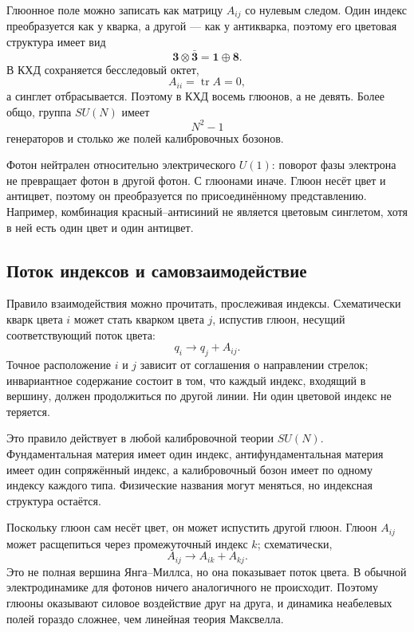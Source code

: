 Глюонное поле можно записать как матрицу \(A_{ij}\) со нулевым следом. Один индекс преобразуется как у кварка, а другой — как у антикварка, поэтому его цветовая структура имеет вид
\begin{equation}
\boldsymbol 3\otimes\bar{\boldsymbol 3}
=\boldsymbol 1\oplus\boldsymbol 8.
\end{equation}
В КХД сохраняется бесследовый октет,
\begin{equation}
A_{ii}=\operatorname{tr}A=0,
\end{equation}
а синглет отбрасывается. Поэтому в КХД восемь глюонов, а не девять. Более общо, группа \(SU(N)\) имеет
\begin{equation}
N^2-1
\end{equation}
генераторов и столько же полей калибровочных бозонов.

Фотон нейтрален относительно электрического \(U(1)\): поворот фазы электрона не превращает фотон в другой фотон. С глюонами иначе. Глюон несёт цвет и антицвет, поэтому он преобразуется по присоединённому представлению. Например, комбинация красный--антисиний не является цветовым синглетом, хотя в ней есть один цвет и один антицвет.

\subsection{Поток индексов и самовзаимодействие}

Правило взаимодействия можно прочитать, прослеживая индексы. Схематически кварк цвета \(i\) может стать кварком цвета \(j\), испустив глюон, несущий соответствующий поток цвета:
\begin{equation}
q_i\longrightarrow q_j+A_{ij}.
\label{eq:l5-quark-gluon-vertex}
\end{equation}
Точное расположение \(i\) и \(j\) зависит от соглашения о направлении стрелок; инвариантное содержание состоит в том, что каждый индекс, входящий в вершину, должен продолжиться по другой линии. Ни один цветовой индекс не теряется.

Это правило действует в любой калибровочной теории \(SU(N)\). Фундаментальная материя имеет один индекс, антифундаментальная материя имеет один сопряжённый индекс, а калибровочный бозон имеет по одному индексу каждого типа. Физические названия могут меняться, но индексная структура остаётся.

Поскольку глюон сам несёт цвет, он может испустить другой глюон. Глюон \(A_{ij}\) может расщепиться через промежуточный индекс \(k\); схематически,
\begin{equation}
A_{ij}\longrightarrow A_{ik}+A_{kj}.
\label{eq:l5-three-gluon-index}
\end{equation}
Это не полная вершина Янга--Миллса, но она показывает поток цвета. В обычной электродинамике для фотонов ничего аналогичного не происходит. Поэтому глюоны оказывают силовое воздействие друг на друга, и динамика неабелевых полей гораздо сложнее, чем линейная теория Максвелла.

